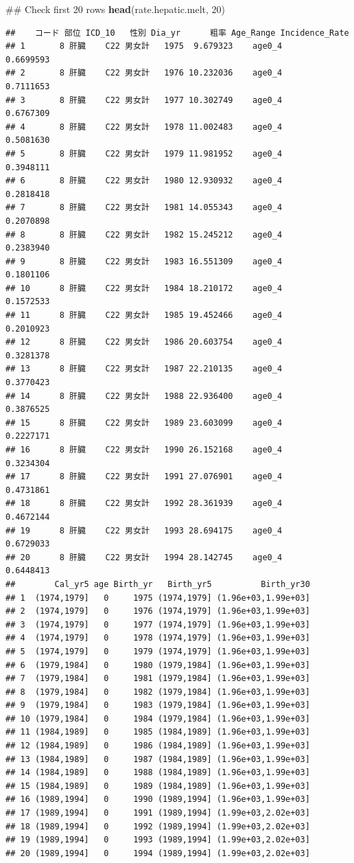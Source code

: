 \documentclass[11pt,]{article}
\newenvironment{Shaded}{\begin{snugshade}}{\end{snugshade}}
\newcommand{\KeywordTok}[1]{\textcolor[rgb]{0.13,0.29,0.53}{\textbf{{#1}}}}
\newcommand{\DecValTok}[1]{\textcolor[rgb]{0.00,0.00,0.81}{{#1}}}
\newcommand{\NormalTok}[1]{{#1}}
\begin{document}
\begin{Shaded}
\begin{Highlighting}[]
\NormalTok{## Check first 20 rows}
\KeywordTok{head}\NormalTok{(rate.hepatic.melt, }\DecValTok{20}\NormalTok{)}
\end{Highlighting}
\end{Shaded}

\begin{verbatim}
##    コード 部位 ICD_10   性別 Dia_yr      粗率 Age_Range Incidence_Rate
## 1       8 肝臓    C22 男女計   1975  9.679323    age0_4      0.6699593
## 2       8 肝臓    C22 男女計   1976 10.232036    age0_4      0.7111653
## 3       8 肝臓    C22 男女計   1977 10.302749    age0_4      0.6767309
## 4       8 肝臓    C22 男女計   1978 11.002483    age0_4      0.5081630
## 5       8 肝臓    C22 男女計   1979 11.981952    age0_4      0.3948111
## 6       8 肝臓    C22 男女計   1980 12.930932    age0_4      0.2818418
## 7       8 肝臓    C22 男女計   1981 14.055343    age0_4      0.2070898
## 8       8 肝臓    C22 男女計   1982 15.245212    age0_4      0.2383940
## 9       8 肝臓    C22 男女計   1983 16.551309    age0_4      0.1801106
## 10      8 肝臓    C22 男女計   1984 18.210172    age0_4      0.1572533
## 11      8 肝臓    C22 男女計   1985 19.452466    age0_4      0.2010923
## 12      8 肝臓    C22 男女計   1986 20.603754    age0_4      0.3281378
## 13      8 肝臓    C22 男女計   1987 22.210135    age0_4      0.3770423
## 14      8 肝臓    C22 男女計   1988 22.936400    age0_4      0.3876525
## 15      8 肝臓    C22 男女計   1989 23.603099    age0_4      0.2227171
## 16      8 肝臓    C22 男女計   1990 26.152168    age0_4      0.3234304
## 17      8 肝臓    C22 男女計   1991 27.076901    age0_4      0.4731861
## 18      8 肝臓    C22 男女計   1992 28.361939    age0_4      0.4672144
## 19      8 肝臓    C22 男女計   1993 28.694175    age0_4      0.6729033
## 20      8 肝臓    C22 男女計   1994 28.142745    age0_4      0.6448413
##        Cal_yr5 age Birth_yr   Birth_yr5          Birth_yr30
## 1  (1974,1979]   0     1975 (1974,1979] (1.96e+03,1.99e+03]
## 2  (1974,1979]   0     1976 (1974,1979] (1.96e+03,1.99e+03]
## 3  (1974,1979]   0     1977 (1974,1979] (1.96e+03,1.99e+03]
## 4  (1974,1979]   0     1978 (1974,1979] (1.96e+03,1.99e+03]
## 5  (1974,1979]   0     1979 (1974,1979] (1.96e+03,1.99e+03]
## 6  (1979,1984]   0     1980 (1979,1984] (1.96e+03,1.99e+03]
## 7  (1979,1984]   0     1981 (1979,1984] (1.96e+03,1.99e+03]
## 8  (1979,1984]   0     1982 (1979,1984] (1.96e+03,1.99e+03]
## 9  (1979,1984]   0     1983 (1979,1984] (1.96e+03,1.99e+03]
## 10 (1979,1984]   0     1984 (1979,1984] (1.96e+03,1.99e+03]
## 11 (1984,1989]   0     1985 (1984,1989] (1.96e+03,1.99e+03]
## 12 (1984,1989]   0     1986 (1984,1989] (1.96e+03,1.99e+03]
## 13 (1984,1989]   0     1987 (1984,1989] (1.96e+03,1.99e+03]
## 14 (1984,1989]   0     1988 (1984,1989] (1.96e+03,1.99e+03]
## 15 (1984,1989]   0     1989 (1984,1989] (1.96e+03,1.99e+03]
## 16 (1989,1994]   0     1990 (1989,1994] (1.96e+03,1.99e+03]
## 17 (1989,1994]   0     1991 (1989,1994] (1.99e+03,2.02e+03]
## 18 (1989,1994]   0     1992 (1989,1994] (1.99e+03,2.02e+03]
## 19 (1989,1994]   0     1993 (1989,1994] (1.99e+03,2.02e+03]
## 20 (1989,1994]   0     1994 (1989,1994] (1.99e+03,2.02e+03]
\end{verbatim}
\end{document}
